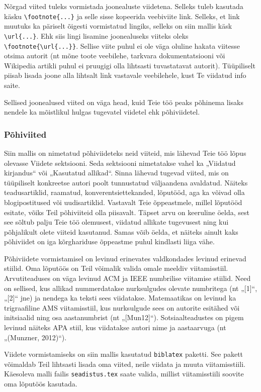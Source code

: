 Nõrgad viited tuleks vormistada joonealuste viidetena. Selleks tuleb kasutada käsku \verb|\footnote{...}| ja selle sisse kopeerida veebiviite link. Selleks, et link muutuks ka päriselt õigesti vormistatud lingiks, selleks on siin mallis käsk \verb|\url{...}|. Ehk siis lingi lisamine joonealuseks viiteks oleks \verb|\footnote{\url{...}}|. Sellise viite puhul ei ole väga oluline hakata viitesse otsima autorit (nt mõne toote veebilehe, tarkvara dokumentatsiooni või Wikipedia artikli puhul ei pruugigi olla lihtsasti tuvastatavat autorit). Tüüpiliselt piisab lisada joone alla lihtsalt link vastavale veebilehele, kust Te viidatud info saite.

Sellised joonealused viited on väga head, kuid Teie töö peaks põhinema lisaks nendele ka mõistlikul hulgas tugevatel viidetel ehk põhiviidetel.

\subsubsection{Põhiviited}
Siin mallis on nimetatud põhiviideteks neid viiteid, mis lähevad Teie töö lõpus olevasse Viidete sektsiooni. Seda sektsiooni nimetatakse vahel ka „Viidatud kirjandus“ või „Kasutatud allikad“. Sinna lähevad tugevad viited, mis on tüüpiliselt konkreetse autori poolt tunnustatud väljaandena avaldatud. Näiteks teadusartiklid, raamatud, konverentsiettekanded, lõputööd, aga ka võivad olla blogipostitused või uudisartiklid. Vastavalt Teie õppeastmele, millel lõputööd esitate, võiks Teil põhiviiteid olla piisavalt. Täpset arvu on keeruline öelda, sest see sõltub palju Teie töö olemusest, viidatud allikate tugevusest ning kui põhjalikult olete viiteid kasutanud. Samas võib öelda, et näiteks ainult kaks põhiviidet on iga kõrghariduse õppeastme puhul kindlasti liiga vähe.

Põhiviidete vormistamisel on levinud erinevates valdkondades levinud erinevad stiilid. Oma lõputöös on Teil võimalik valida omale meeldiv viitamisstiil. Arvutiteaduses on väga levinud ACM ja IEEE numbrilise viitamise stiilid. Need on sellised, kus allikad nummerdatakse nurksulgudes olevate numbritega (nt „[1]“, „[2]“ jne) ja nendega ka teksti sees viidatakse. Matemaatikas on levinud ka trigraafiline AMS viitamisstiil, kus nurksulgude sees on autorite esitähed või initsiaalid ning osa aastanumbrist (nt „[Mun12]“). Sotsiaalteadustes on pigem levinud näiteks APA stiil, kus viidatakse autori nime ja aastaarvuga (nt „(Munzner, 2012)“).

Viidete vormistamiseks on siin mallis kasutatud \verb|biblatex| paketti. See pakett võimaldab Teil lihtsasti lisada oma viited, neile viidata ja muuta viitamisstiili. Käesoleva malli failis \verb|seadistus.tex| saate valida, millist viitamisstiili soovite oma lõputöös kasutada.

